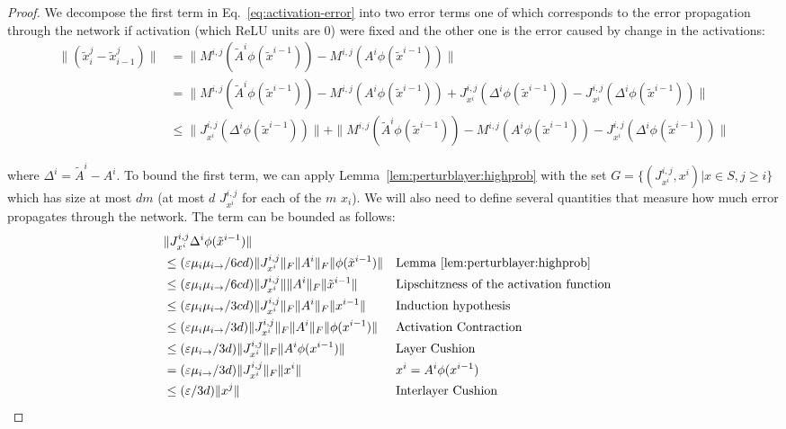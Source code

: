 \begin{proof}
    We decompose the first term in Eq.~\ref{eq:activation-error} into two error terms one of which corresponds to the error propagation through the network if activation (which ReLU units are $0$) were fixed and the other one is the error caused by change in the activations:
    \begin{align*}
    \|(\tilde{x}^j_i - \tilde{x}^j_{i-1})\|
    & = \|M^{i,j}(\tilde{A}^i \phi(\tilde{x}^{i-1})) - M^{i,j}(A^i \phi(\tilde{x}^{i-1}))\|\\
    & = \|M^{i,j}(\tilde{A}^i \phi(\tilde{x}^{i-1})) - M^{i,j}(A^i \phi(\tilde{x}^{i-1})) + J^{i,j}_{x^i}(\Delta^i \phi(\tilde{x}^{i-1})) - J^{i,j}_{x^i}(\Delta^i \phi(\tilde{x}^{i-1}))\| \\
    & \leq \|J^{i,j}_{x^i}(\Delta^i \phi(\tilde{x}^{i-1}))\| + \|M^{i,j}(\tilde{A}^i \phi(\tilde{x}^{i-1})) - M^{i,j}(A^i \phi(\tilde{x}^{i-1})) - J^{i,j}_{x^i}(\Delta^i \phi(\tilde{x}^{i-1}))\| 
    \end{align*}

    where $\Delta^i = \tilde{A}^i - A^i$. To bound the first term, we can apply Lemma~\ref{lem:perturblayer:highprob} with the set $G=\{(J^{i,j}_{x^i},x^i)|x\in S,j\geq i\}$ which has size at most $dm$ (at most $d$ $J^{i,j}_{x^i}$ for each of the $m$ $x_i$). We will also need to define several quantities that measure how much error propagates through the network. The term can be bounded as follows:
    \begin{align*}
    & \|J^{i,j}_{x^i}\Delta^i \phi(\tilde{x}^{i-1})\|\\
    & \le (\eps\mu_i\icu/6cd)\|J^{i,j}_{x^i}\|_F\|A^i\|_F\|\phi(\tilde{x}^{i-1})\|&& \mbox{Lemma~\ref{lem:perturblayer:highprob}}\\
    & \le (\eps\mu_i\icu/6cd)\|J^{i,j}_{x^i}\|\|A^i\|_F\|\tilde{x}^{i-1}\|&& \mbox{Lipschitzness of the activation function}\\
    &\le (\eps\mu_i\icu/3cd)\|J^{i,j}_{x^i}\|_F\|A^i\|_F\|x^{i-1}\|&& \mbox{Induction hypothesis} \\
    &\le (\eps\mu_i\icu/3d)\|J^{i,j}_{x^i}\|_F\|A^i\|_F \|\phi(x^{i-1})\|&& \mbox{Activation Contraction} \\
    &\le (\eps\icu/3d)\|J^{i,j}_{x^i}\|_F\|A^i \phi(x^{i-1})\|&& \mbox{Layer Cushion} \\
    & = (\eps\icu/3d)\|J^{i,j}_{x^i}\|_F\|x^i\|&& x^i = A^i\phi(x^{i-1})\\
    & \le (\eps/3d) \|x^j\|&& \mbox{Interlayer Cushion} 
    \end{align*}


\end{proof}

